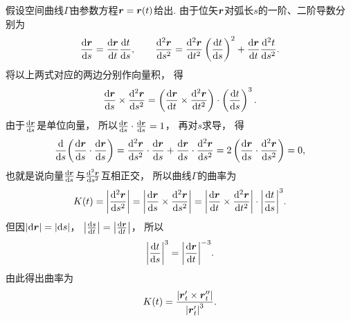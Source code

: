 假设空间曲线\(\Gamma\)由参数方程\(\boldsymbol{r} = \boldsymbol{r}(t)\)给出.
由于位矢\(\boldsymbol{r}\)对弧长\(s\)的一阶、二阶导数分别为\[
	\dv{\boldsymbol{r}}{s}
	= \dv{\boldsymbol{r}}{t} \dv{t}{s},
	\qquad
	\dv[2]{\boldsymbol{r}}{s}
	= \dv[2]{\boldsymbol{r}}{t} \left(\dv{t}{s}\right)^2 + \dv{\boldsymbol{r}}{t} \dv[2]{t}{s}.
\]
将以上两式对应的两边分别作向量积，
得\[
	\dv{\boldsymbol{r}}{s} \times \dv[2]{\boldsymbol{r}}{s}
	= \left(\dv{\boldsymbol{r}}{t} \times \dv[2]{\boldsymbol{r}}{t}\right) \cdot \left(\dv{t}{s}\right)^3.
\]
由于\(\dv{\boldsymbol{r}}{s}\)是单位向量，
所以\(\dv{\boldsymbol{r}}{s} \cdot \dv{\boldsymbol{r}}{s} = 1\)，
再对\(s\)求导，
得\[
	\dv{s}( \dv{\boldsymbol{r}}{s} \cdot \dv{\boldsymbol{r}}{s} )
	= \dv[2]{\boldsymbol{r}}{s} \cdot \dv{\boldsymbol{r}}{s} + \dv{\boldsymbol{r}}{s} \cdot \dv[2]{\boldsymbol{r}}{s}
	= 2 \left( \dv{\boldsymbol{r}}{s} \cdot \dv[2]{\boldsymbol{r}}{s} \right)
	= 0,
\]
也就是说向量\(\dv{\boldsymbol{r}}{s}\)与\(\dv[2]{\boldsymbol{r}}{s}\)互相正交，
所以曲线\(\Gamma\)的曲率为\[
	K(t) = \abs{ \dv[2]{\boldsymbol{r}}{s} }
	= \abs{ \dv{\boldsymbol{r}}{s} \times \dv[2]{\boldsymbol{r}}{s} }
	= \abs{ \dv{\boldsymbol{r}}{t} \times \dv[2]{\boldsymbol{r}}{t} } \cdot \abs{ \dv{t}{s} }^3.
\]
但因\(\abs{ \dd{\boldsymbol{r}} } = \abs{ \dd{s} }\)，
\(\abs{ \dv{s}{t} } = \abs{ \dv{\boldsymbol{r}}{t} }\)，
所以\[
	\abs{ \dv{t}{s} }^3 = \abs{ \dv{\boldsymbol{r}}{t} }^{-3}.
\]
由此得出曲率为\begin{equation}
	K(t) = \frac{ \abs{ \boldsymbol{r}'_t \times \boldsymbol{r}''_t } }{ \abs{ \boldsymbol{r}'_t }^3 }.
\end{equation}
